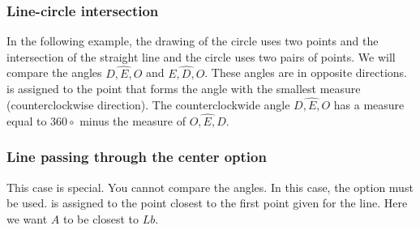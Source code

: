 \subsubsection{Line-circle intersection}

In the following example, the drawing of the circle uses two points and the intersection of the straight line and the circle uses two pairs of points. We will compare the angles $\widehat{D,E,O}$ and $\widehat{E,D,O}$. These angles are in opposite directions.  is assigned to the point that forms the angle with the smallest measure (counterclockwise direction). The counterclockwide angle  $\widehat{D,E,O}$   has a measure equal to  $360\circ$ minus the measure of  $\widehat{O,E,D}$.

\begin{tkzexample}[latex=7cm,small]
\end{tkzexample}

\subsubsection{Line passing through the center option }
This case is special. You cannot compare the angles. In this case, the option  must be used.  is assigned to the point closest to the first point given for the line. Here we want $A$ to be closest to $Lb$.

\begin{tkzexample}[latex=8cm,small]
\end{tkzexample}

